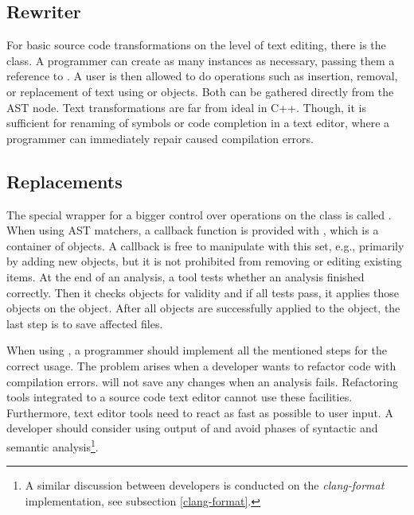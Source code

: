 \subsection{Rewriter}
For basic source code transformations on the level of text editing, there is the  class. A programmer can create as many instances as necessary, passing them a reference to . A user is then allowed to do operations such as insertion, removal, or replacement of text using  or  objects. Both can be gathered directly from the AST node. Text transformations are far from ideal in C++. Though, it is sufficient for renaming of symbols or code completion in a text editor, where a programmer can immediately repair caused compilation errors.

\subsection{Replacements}
The special wrapper for a bigger control over operations on the  class is called  . When using AST matchers, a callback function is provided with , which is a container of  objects. A callback is free to manipulate with this set, e.g., primarily by adding new objects, but it is not prohibited from removing or editing existing items. At the end of an analysis, a tool tests whether an analysis finished correctly. Then it checks  objects for validity and if all tests pass, it applies those objects on the  object. After all  objects are successfully applied to the  object, the last step is to save affected files.

When using , a programmer should implement all the mentioned steps for the correct usage. The problem arises when a developer wants to refactor code with compilation errors.  will not save any changes when an analysis fails. Refactoring tools integrated to a source code text editor cannot use these facilities. Furthermore, text editor tools need to react as fast as possible to user input. A developer should consider using output of  and avoid phases of syntactic and semantic analysis\footnote{A similar discussion between developers is conducted on the \emph{clang-format} implementation, see subsection \ref{clang-format}.}.

